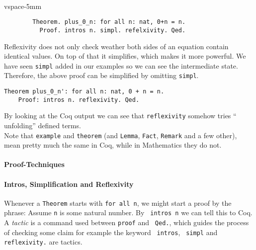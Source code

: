    \begin{example}
	   \begin{theorem} ~\\vspace{-5mm}
  	   \begin{lstlisting}
   		Theorem. plus_0_n: for all n: nat, 0+n = n.
   		  Proof. intros n. simpl. refelxivity. Qed.
    	\end{lstlisting}	
	\end{theorem}
	\end{example}              
    \begin{remark}
    	Reflexivity does not only check weather both sides of an equation contain identical values. 
    	On top of that it simplifies, which makes it more powerful. 
    	We have seen \lstinline!simpl! added in our examples so we can see the intermediate state.
    	Therefore, the above proof can be simplified by omitting \lstinline!simpl!. 
     \end{remark}
     



	\begin{lstlisting}[caption={ \lstinline!plus_0_n'!}, label= lst:plus0nPrime]
    Theorem plus_0_n': for all n: nat, 0 + n = n.
    Proof: intros n. reflexivity. Qed.	
    \end{lstlisting}    
    By looking at the Coq output we can see that \lstinline!reflexivity! somehow tries ``	unfolding'' defined terms.\\    
    Note that \lstinline!example! and \lstinline!theorem! (and \lstinline!Lemma!, \lstinline!Fact!, \lstinline!Remark! and a few other),
    mean pretty much the same in Coq, while in Mathematics they do not.
    
   
     
    \paragraph{Proof-Techniques}
    
    \paragraph{Intros, Simplification and Reflexivity}
     Whenever a \lstinline!Theorem! starts with \lstinline!for all n!, we might start a proof by the phrase:
     Assume \lstinline!n! is some natural number. By \lstinline! intros n! we can tell this to Coq.\\
     A {\itshape tactic} is a command used between \lstinline!proof! and \lstinline! Qed.!, 
     which guides the process of checking some claim for example the keyword \lstinline! intros!, \lstinline! simpl! and \lstinline!reflexivity.! 
     are tactics.
     
